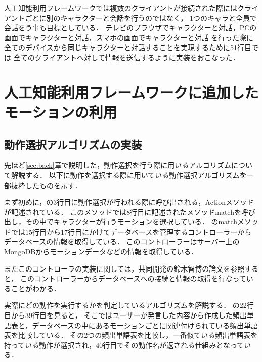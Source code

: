 人工知能利用フレームワークでは複数のクライアントが接続された際にはクライアントごとに別のキャラクターと会話を行うのではなく，
1つのキャラと全員で会話をう事も目標としている．
テレビのブラウザでキャラクターと対話，PCの画面でキャラクターと対話，スマホの画面でキャラクターと対話
を行った際に全てのデバイスから同じキャラクターと対話することを実現するために51行目では
全てのクライアントへ対して情報を送信するように実装をおこなった．


\section{人工知能利用フレームワークに追加したモーションの利用}\label{sec:motion}
\subsection{動作選択アルゴリズムの実装}
先ほど\ref{sec:back}章で説明した，動作選択を行う際に用いるアルゴリズムについて解説する．
以下に動作を選択する際に用いている動作選択アルゴリズムを一部抜粋したものを示す．


まず初めに，の3行目に動作選択が行われる際に呼び出される，Actionメソッドが記述されている．
このメソッドでは8行目に記述されたメソッドmatchを呼び出し，その中でキャラクターが行うモーションを選択している．
のmatchメソッドでは15行目から17行目にかけてデータベースを管理するコントローラーから
データベースの情報を取得している．
このコントローラーはサーバー上のMongoDBからモーションデータなどの情報を取得している．

またこのコントローラの実装に関しては，共同開発の鈴木智博の論文\cite{suzuki}を参照すると，
このコントローラーからデータベースへの接続と情報の取得を行なっていることがわかる．

実際にどの動作を実行するかを判定しているアルゴリズムを解説する．
の22行目から39行目を見ると，
そこではユーザーが発言した内容から作成した頻出単語表と，データベースの中にあるモーションごとに関連付けられている頻出単語表を比較している．
その2つの頻出単語表を比較し，一番似ている頻出単語表を持っている動作が選択され，40行目でその動作名が返される仕組みとなっている．
